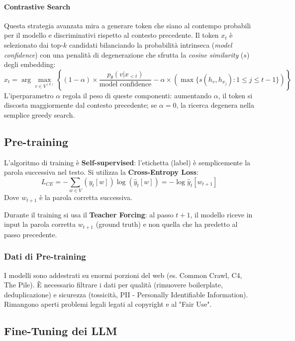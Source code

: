         \paragraph{Contrastive Search}
        Questa strategia avanzata mira a generare token che siano al contempo probabili per il modello e discriminativi rispetto al contesto precedente. Il token $x_t$ è selezionato dai top-$k$ candidati bilanciando la probabilità intrinseca (\textit{model confidence}) con una penalità di degenerazione che sfrutta la \textit{cosine similarity} ($s$) degli embedding:
        $$x_t = \arg\max_{v \in V^{(k)}} \left\{ (1-\alpha) \times \frac{p_\theta(v|x_{<t})}{\text{model confidence}} - \alpha \times (\max \{s(h_v, h_{x_j}): 1 \le j \le t-1\}) \right\}$$
        L'iperparametro $\alpha$ regola il peso di queste componenti: aumentando $\alpha$, il token si discosta maggiormente dal contesto precedente; se $\alpha = 0$, la ricerca degenera nella semplice greedy search.

    \newpage

    \subsection{Pre-training}

        L'algoritmo di training è \textbf{Self-supervised}: l'etichetta (label) è semplicemente la parola successiva nel testo.
        Si utilizza la \textbf{Cross-Entropy Loss}:
        $$ L_{CE} = - \sum_{w \in V} (y_t[w]) \log(\hat{y}_t[w]) = - \log \hat{y}_t[w_{t+1}] $$
        Dove $w_{t+1}$ è la parola corretta successiva.

        Durante il training si usa il \textbf{Teacher Forcing}: al passo $t+1$, il modello riceve in input la parola corretta $w_{t+1}$ (ground truth) e non quella che ha predetto al passo precedente.

        \subsubsection{Dati di Pre-training}
            I modelli sono addestrati su enormi porzioni del web (es. Common Crawl, C4, The Pile).
            È necessario filtrare i dati per qualità (rimuovere boilerplate, deduplicazione) e sicurezza (tossicità, PII - Personally Identifiable Information).
            Rimangono aperti problemi legali legati al copyright e al "Fair Use".

    \subsection{Fine-Tuning dei LLM}

